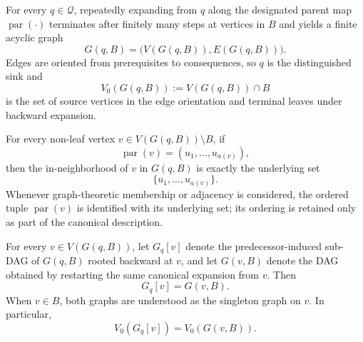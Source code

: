 \documentclass[10pt,a4paper]{amsart}
\begin{document}
\begin{assumption}
\label{assump:hereditary-dag}
For every \(q\in\mathcal Q\), repeatedly expanding from \(q\) along the
designated parent map \(\operatorname{par}(\cdot)\) terminates after finitely
many steps at vertices in \(B\) and yields a finite acyclic graph
\[
  G(q,B)=\bigl(V(G(q,B)),E(G(q,B))\bigr).
\]
Edges are oriented from prerequisites to consequences, so \(q\) is the
distinguished sink and
\[
  V_0(G(q,B))
  :=
  V(G(q,B))\cap B
\]
is the set of source vertices in the edge orientation and terminal leaves
under backward expansion.

For every non-leaf vertex
\(v\in V(G(q,B))\setminus B\), if
\[
  \operatorname{par}(v)=(u_1,\ldots,u_{a(v)}),
\]
then the in-neighborhood of \(v\) in \(G(q,B)\) is exactly the underlying set
\[
  \{u_1,\ldots,u_{a(v)}\}.
\]
Whenever graph-theoretic membership or adjacency is considered, the ordered
tuple \(\operatorname{par}(v)\) is identified with its underlying set; its
ordering is retained only as part of the canonical description.

For every \(v\in V(G(q,B))\), let \(G_q[v]\) denote the predecessor-induced
sub-DAG of \(G(q,B)\) rooted backward at \(v\), and let \(G(v,B)\) denote the
DAG obtained by restarting the same canonical expansion from \(v\).  Then
\begin{equation}
  G_q[v]=G(v,B).
\label{eq:hereditary-subdag}
\end{equation}
When \(v\in B\), both graphs are understood as the singleton graph on \(v\).
In particular,
\begin{equation}
  V_0(G_q[v])=V_0(G(v,B)).
\label{eq:hereditary-leaves}
\end{equation}
\end{assumption}
\end{document}
